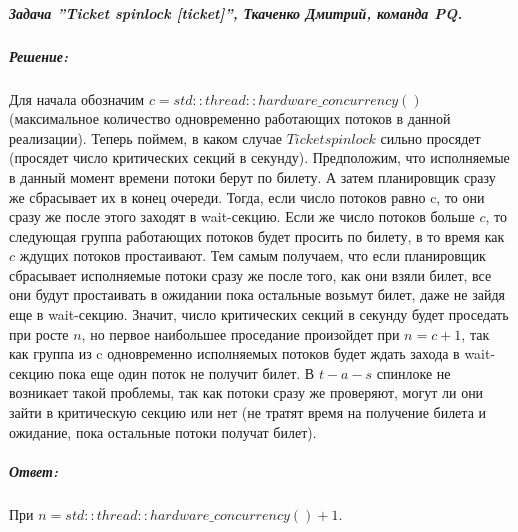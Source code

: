 \documentclass{article}
\begin{document}
\subparagraph{\textit{ Задача ''Ticket spinlock [ticket]'', Ткаченко Дмитрий, команда PQ.}}

\subparagraph{Решение:} Для начала обозначим $c = std::thread::hardware\_concurrency()$ (максимальное количество одновременно работающих потоков в данной реализации). Теперь поймем, в каком случае $Ticket  spinlock$ сильно просядет (просядет число критических секций в секунду). Предположим, что исполняемые в данный момент времени потоки берут по билету. А затем планировщик сразу же сбрасывает их в конец очереди. Тогда, если число потоков равно c, то они сразу же после этого заходят в wait-секцию. Если же число потоков больше $c$, то следующая группа работающих потоков будет просить по билету, в то время как $c$ ждущих потоков простаивают. Тем самым получаем, что если планировщик сбрасывает исполняемые потоки сразу же после того, как они взяли билет, все они будут простаивать в ожидании пока остальные возьмут билет, даже не зайдя еще в wait-секцию. Значит, число критических секций в секунду будет проседать при росте $n$, но первое наибольшее проседание произойдет при $n = c + 1$, так как группа из c одновременно исполняемых потоков будет ждать захода в wait-секцию пока еще один поток не получит билет. В $t-a-s$ спинлоке не возникает такой проблемы, так как потоки сразу же проверяют, могут ли они зайти в критическую секцию или нет (не тратят время на получение билета и ожидание, пока остальные потоки получат билет).

\subparagraph{Ответ:} При $n = std::thread::hardware\_concurrency() + 1$.
\end{document}
